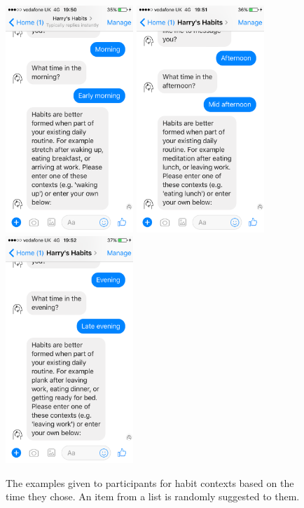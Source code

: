 \begin{figure}[H]
  \centering

  \includegraphics[width=1.9in]{../resources/design/context-morning.png}
  \hspace{10px}
  \includegraphics[width=1.9in]{../resources/design/context-afternoon.png}
  \hspace{10px}
  \includegraphics[width=1.9in]{../resources/design/context-evening.png}

  \caption{The examples given to participants for habit contexts based on the time they chose. An item from a list is randomly suggested to them.}
  \label{fig:habit_context_example}
\end{figure}



